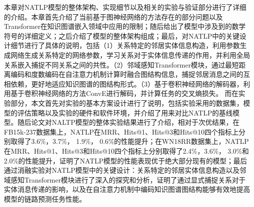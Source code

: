 本章对NATLP模型的整体架构、实现细节以及相关的实验与验证部分进行了详细的介绍。本章首先介绍了当前基于图神经网络的方法存在的部分问题以及Transformer在知识图谱嵌入领域中应用的限制；随后给出了模型中涉及到的数学符号的详细定义；之后介绍了模型的整体架构组成；最后，对NATLP中的关键设计细节进行了具体的说明，包括（1）关系特定的邻居实体信息构造，利用参数生成网络生成关系特定的网络参数，学习关系对于实体信息传递的作用，并利用全局关系嵌入捕捉不同关系之间的共性。（2）邻域感知Transformer模块，通过最短距离编码和度数编码在自注意力机制计算时融合图结构信息，捕捉邻居消息之间的互相依赖，更好地适应知识图谱的图结构形式。（3）基于卷积神经网络的解码器，利用基于卷积神经网络的方法ConvE进行解码，并计算任务的交叉熵损失。
而在实验部分，本文首先对实验的基本方案设计进行了说明，包括实验采用的数据集，模型的评估策略以及实验的硬件和软件环境，并介绍了用来对比NATLP的基线模型。随后论文对NALTP模型的整体实验结果进行了介绍，相对于次优结果，在FB15k-237数据集上，NATLP在MRR、Hits@1、Hits@3和Hits@10四个指标上分别取得了3.6\%，3.7\%， 1.9\%， 0.6\%的性能提升；在WN18RR数据集上，NATLP在MRR、Hits@1、Hits@3和Hits@10四个指标上分别取得了2.4\%，3.6\%， 3.0\%和2.0\%的性能提升，证明了NATLP模型的性能表现优于绝大部分现有的模型；最后通过消融实验对NATLP模型中的关键设计：关系特定的邻居实体信息构造以及邻域感知Transformer模块进行了深入的探究和分析，证明了通过显式捕捉关系对于实体消息传递的影响，以及在自注意力机制中编码知识图谱图结构能够有效地提高模型的链路预测任务性能。